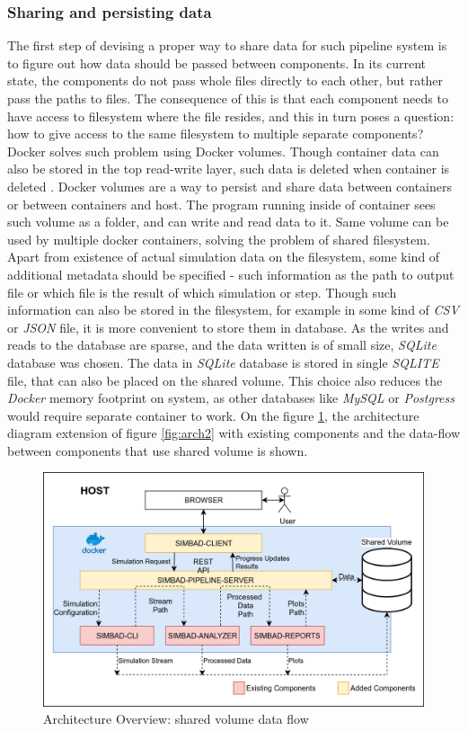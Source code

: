 \subsubsection{Sharing and persisting data}
The first step of devising a proper way to share data for such pipeline system is to figure out how data should be passed between components. In its current state, the components do not pass whole files directly to each other, but rather pass the paths to files. The consequence of this is that each component needs to have access to filesystem where the file resides, and this in turn poses a question: how to give access to the same filesystem to multiple separate components? Docker solves such problem using Docker volumes. Though container data can also be stored in the top read-write layer, such data is deleted when container is deleted \cite{DockerStorage}. Docker volumes are a way to persist and share data between containers or between containers and host. The program running inside of container sees such volume as a folder, and can write and read data to it. Same volume can be used by multiple docker containers, solving the problem of shared filesystem. Apart from existence of actual simulation data on the filesystem, some kind of additional metadata should be specified - such information as the path to output file or which file is the result of which simulation or step. Though such information can also be stored in the filesystem, for example in some kind of \textit{CSV} or \textit{JSON} file, it is more convenient to store them in database. As the writes and reads to the database are sparse, and the data written is of small size, \textit{SQLite} database was chosen. The data in \textit{SQLite} database is stored in single \textit{SQLITE} file, that can also be placed on the shared volume. This choice also reduces the \textit{Docker} memory footprint on system, as other databases like \textit{MySQL} or \textit{Postgress} would require separate container to work. On the figure \ref{fig:arch4}, the architecture diagram extension of figure \ref{fig:arch2} with existing components and the data-flow between components that use shared volume is shown.
\begin{figure}[h!]
	\centering
		\includegraphics[width=0.9\linewidth]{diagrams/arch4.png}
	\caption{Architecture Overview: shared volume data flow}
	\label{fig:arch4}
\end{figure}
